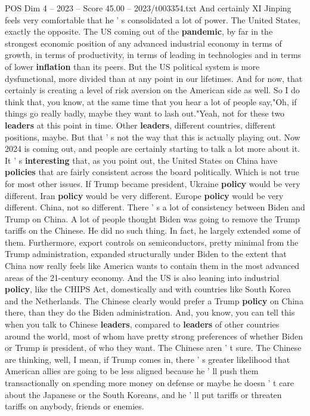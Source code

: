 \begin{textsample}{POS Dim 4 – 2023 – Score 45.00 – 2023/t003354.txt}
And certainly XI Jinping feels very comfortable that he ' s consolidated a lot of power.
The United States, exactly the opposite.
The US coming out of the \textbf{pandemic}, by far in the strongest economic position of any advanced industrial economy in terms of growth, in terms of productivity, in terms of leading in technologies and in terms of lower \textbf{inflation} than its peers.
But the US political system is more dysfunctional, more divided than at any point in our lifetimes.
And for now, that certainly is creating a level of risk aversion on the American side as well.
So I do think that, you know, at the same time that you hear a lot of people say,"Oh, if things go really badly, maybe they want to lash out."Yeah, not for these two \textbf{leaders} at this point in time.
Other \textbf{leaders}, different countries, different positions, maybe.
But that ' s not the way that this is actually playing out.
Now 2024 is coming out, and people are certainly starting to talk a lot more about it.
It ' s \textbf{interesting} that, as you point out, the United States on China have \textbf{policies} that are fairly consistent across the board politically.
Which is not true for most other issues.
If Trump became president, Ukraine \textbf{policy} would be very different.
Iran \textbf{policy} would be very different.
Europe \textbf{policy} would be very different.
China, not so different.
There ' s a lot of consistency between Biden and Trump on China.
A lot of people thought Biden was going to remove the Trump tariffs on the Chinese.
He did no such thing.
In fact, he largely extended some of them.
Furthermore, export controls on semiconductors, pretty minimal from the Trump administration, expanded structurally under Biden to the extent that China now really feels like America wants to contain them in the most advanced areas of the 21-century economy.
And the US is also leaning into industrial \textbf{policy}, like the CHIPS Act, domestically and with countries like South Korea and the Netherlands.
The Chinese clearly would prefer a Trump \textbf{policy} on China there, than they do the Biden administration.
And, you know, you can tell this when you talk to Chinese \textbf{leaders}, compared to \textbf{leaders} of other countries around the world, most of whom have pretty strong preferences of whether Biden or Trump is president, of who they want.
The Chinese aren ' t sure.
The Chinese are thinking, well, I mean, if Trump comes in, there ' s greater likelihood that American allies are going to be less aligned because he ' ll push them transactionally on spending more money on defense or maybe he doesn ' t care about the Japanese or the South Koreans, and he ' ll put tariffs or threaten tariffs on anybody, friends or enemies.

\end{textsample}
